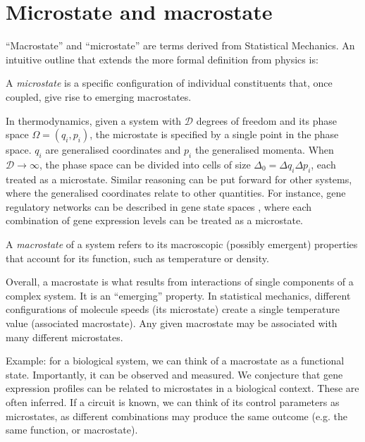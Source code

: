 \tocless\section{Microstate and macrostate}
\label{sec:micro_macrostate}
``Macrostate'' and ``microstate'' are terms derived from Statistical Mechanics. An intuitive outline that extends the more formal definition from physics \citep{pathria} is:


\begin{definition}
	A \textit{microstate} is a specific configuration of individual constituents that, once coupled, give rise to emerging macrostates.
\end{definition}
In thermodynamics, given a system with $\mathcal{D}$ degrees of freedom and its phase space $\Omega=(q_i,p_i)$, the microstate is specified by a single point in the phase space. $q_i$ are generalised coordinates and $p_i$ the generalised momenta. When $\mathcal{D} \to \infty$, the phase space can be divided into cells of size $\Delta_0 = \Delta q_i \Delta p_i$, each treated as a microstate. Similar reasoning can be put forward for other systems, where the generalised coordinates relate to other quantities. For instance, gene regulatory networks can be described in gene state spaces \citep{wu2020nowcasting}, where each combination of gene expression levels can be treated as a microstate.

\begin{definition}
	A \textit{macrostate} of a system refers to its macroscopic (possibly emergent) properties that account for its function, such as temperature or density. 
\end{definition}


Overall, a macrostate is what results from interactions of single components of a complex system. It is an ``emerging'' property. In statistical mechanics, different configurations of molecule speeds (its microstate) create a single temperature value (associated macrostate). Any given macrostate may be associated with many different microstates.
		
Example: for a biological system, we can think of a macrostate as a functional state. Importantly, it can be observed and measured. We conjecture that gene expression profiles can be related to microstates in a biological context. These are often inferred. If a circuit is known, we can think of its control parameters as microstates, as different combinations may produce the same outcome (e.g. the same function, or macrostate).


